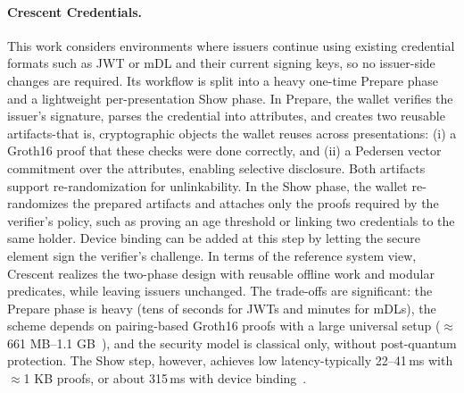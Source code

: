 \paragraph{Crescent Credentials.~\cite{cryptoeprint:2024/2013}}
This work considers environments where issuers continue using existing credential formats such as JWT or mDL and their current signing keys, so no issuer-side changes are required.
Its workflow is split into a heavy one-time Prepare phase and a lightweight per-presentation Show phase.
In Prepare, the wallet verifies the issuer’s signature, parses the credential into attributes, and creates two reusable artifacts-that is, cryptographic objects the wallet reuses across presentations: (i) a Groth16 proof that these checks were done correctly, and (ii) a Pedersen vector commitment over the attributes, enabling selective disclosure.
Both artifacts support re-randomization for unlinkability.
In the Show phase, the wallet re-randomizes the prepared artifacts and attaches only the proofs required by the verifier’s policy, such as proving an age threshold or linking two credentials to the same holder. Device binding can be added at this step by letting the secure element sign the verifier’s challenge.
In terms of the reference system view, Crescent realizes the two-phase design with reusable offline work and modular predicates, while leaving issuers unchanged. The trade-offs are significant: the Prepare phase is heavy (tens of seconds for JWTs and minutes for mDLs), the scheme depends on pairing-based Groth16 proofs with a large universal setup ($\approx$ 661 MB–1.1 GB~\cite[\S4]{cryptoeprint:2024/2013}), and the security model is classical only, without post-quantum protection. The Show step, however, achieves low latency-typically 22–41\,ms with $\approx$1 KB proofs, or about 315\,ms with device binding~\cite[\S4]{cryptoeprint:2024/2013}.

